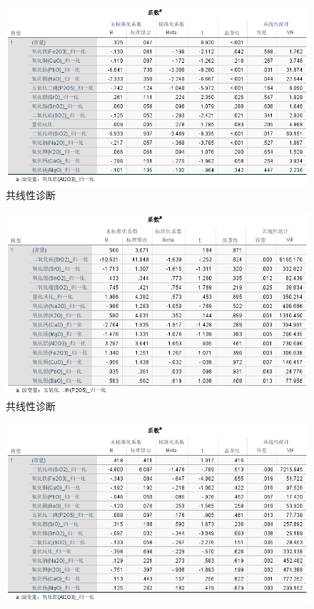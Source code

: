 \documentclass[UTF8]{ctexart}
\begin{document}
\begin{figure}[H]\centering
    \includegraphics[width=1\textwidth,height=0.6\textwidth]{img/1 (26).png} %
    \caption{共线性诊断} %
\end{figure}\begin{figure}[H]\centering
    \includegraphics[width=1\textwidth,height=0.6\textwidth]{img/1 (27).png} %
    \caption{共线性诊断} %
\end{figure}\begin{figure}[H]\centering
    \includegraphics[width=1\textwidth,height=0.6\textwidth]{img/1 (28).png} %

\end{figure}
\end{document}
